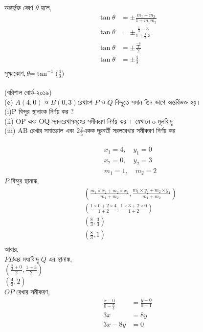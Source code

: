 \documentclass{article}
\begin{document}
অন্তর্ভুক্ত কোণ $\theta$ হলে,\\
\begin{align*}
	\tan\theta&=\pm\frac{m_1-m_2}{1+m_1m_2}\\
	\tan\theta&=\pm\frac{\frac{1}{3}-3}{1+\frac{1}{3}.3}\\
	\tan\theta&=\pm\frac{\frac{-8}{3}}{2}\\
	\tan\theta&=\pm\frac{4}{3}\\
\end{align*}
সূক্ষ্মকোণ$,\theta$=$\tan^{-1}(\frac{4}{3}$)\\ 
\\ 
(বরিশাল বোর্ড-২০১৯)\\ 
(৫) $A(4,0)$ ও $B(0,3)$রেখাংশ $P$ ও $Q$ বিন্দুতে সমান তিন ভাগে অন্তর্বিভক্ত হয়।\\
(i)P বিন্দুর স্থানাংক নির্ণয় কর ?\\
(ii) OP এবং OQ সরলরেখাসমূহের সমীকরণ নির্ণয় কর । যেখানে o মূলবিন্দু \\ 
(iii) AB রেখার সমান্তরাল এবং $2\frac{2}{5}$একক দূরবর্তী সরলরেখার সমীকরণ নির্ণয় কর \\ 
\\
\begin{align*}
&	x_1=4,\quad y_1=0\\
&	x_2=0,\quad y_2=3\\
&m_1=1,\quad m_2=2
\end{align*}
$P$ বিন্দুর স্থানাঙ্ক, \\
\begin{align*}
	&\left(\frac{m_1\times x_2+m_2\times x_1}{m_1+m_2},\frac{m_1\times y_2+m_2\times y_1}{m_1+m_2}\right)\\
	&\left(\frac{1\times0+2\times4}{1+2},\frac{1\times3+2\times0}{1+2}\right)\\
&	\left(\frac{8}{3},\frac{3}{3}\right)\\
&	\left(\frac{8}{3},1\right)\\
\end{align*}
আবার,\\ 
$PB$এর মধ্যবিন্দু $Q$ এর স্থানাঙ্ক,\\
$\left(\frac{\frac{8}{3}+0}{2},\frac{1+3}{2}\right)$\\
$\left(\frac{4}{3},2\right)$\\
$OP$ রেখার সমীকরণ,\\
\begin{align*}
	\frac{x-0}{0-\frac{8}{3}}&=\frac{y-0}{0-1}\\
	3x&=8y\\
	3x-8y&=0\\
\end{align*}
\end{document}
